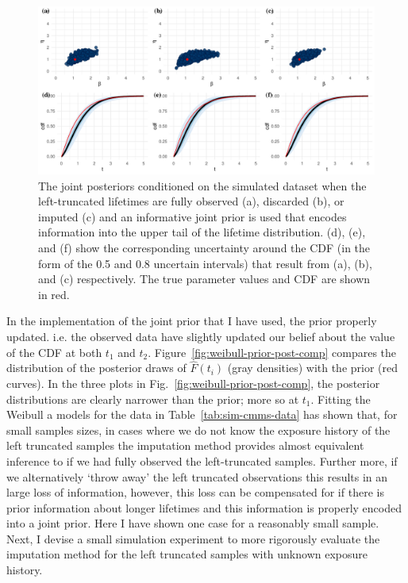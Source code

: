 \begin{figure}
    \centering
    \includegraphics[width=1\textwidth]{./figures/ch-2/joint-posts-inf.pdf}
    \caption{The joint posteriors conditioned on the simulated dataset when the left-truncated lifetimes are fully observed (a), discarded (b), or imputed (c) and an informative joint prior is used that encodes information into the upper tail of the lifetime distribution. (d), (e), and (f) show the corresponding uncertainty around the CDF (in the form of the 0.5 and 0.8 uncertain intervals) that result from (a), (b), and (c) respectively. The true parameter values and CDF are shown in red.}
    \label{fig:joint-post-weibull-inf}
\end{figure}

In the implementation of the joint prior that I have used, the prior properly updated. i.e. the observed data have slightly updated our belief about the value of the CDF at both $t_1$ and $t_2$. Figure~\ref{fig:weibull-prior-post-comp} compares the distribution of the posterior draws of $\hat{F}(t_i)$ (gray densities) with the prior (red curves). In the three plots in Fig.~\ref{fig:weibull-prior-post-comp}, the posterior distributions are clearly narrower than the prior; more so at $t_1$. Fitting the Weibull a models for the data in Table~\ref{tab:sim-cmms-data} has shown that, for small samples sizes, in cases where we do not know the exposure history of the left truncated samples the imputation method provides almost equivalent inference to if we had fully observed the left-truncated samples. Further more, if we alternatively `throw away' the left truncated observations this results in an large loss of information, however, this loss can be compensated for if there is prior information about longer lifetimes and this information is properly encoded into a joint prior. Here I have shown one case for a reasonably small sample. Next, I devise a small simulation experiment to more rigorously evaluate the imputation method for the left truncated samples with unknown exposure history.

